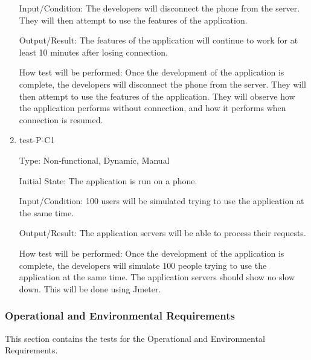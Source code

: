 \documentclass[12pt, titlepage]{article}
\begin{document}
\begin{enumerate}
Input/Condition: The developers will disconnect the phone from the server. They will then attempt to use the features of the application.
					
Output/Result: The features of the application will continue to work for at least 10 minutes after losing connection.
					
How test will be performed: Once the development of the application is complete, the developers will disconnect the phone from the server. They will then attempt to use the features of the application. They will observe how the application performs without connection, and how it performs when connection is resumed.

\item{test-P-C1\\}

Type: Non-functional, Dynamic, Manual 
					
Initial State: The application is run on a phone.
					
Input/Condition: 100 users will be simulated trying to use the application at the same time.
					
Output/Result: The application servers will be able to process their requests.
					
How test will be performed: Once the development of the application is complete, the developers will simulate 100 people trying to use the application at the same time. The application servers should show no slow down. This will be done using Jmeter.


\end{enumerate}

\subsubsection{Operational and Environmental Requirements}

This section contains the tests for the Operational and Environmental Requirements.
		
\end{document}
